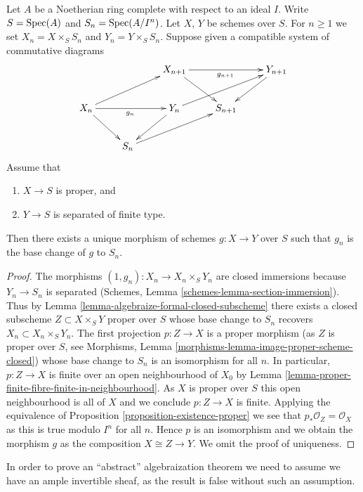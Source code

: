 \begin{lemma}
\label{lemma-algebraize-morphism}
Let $A$ be a Noetherian ring complete with respect to an ideal $I$.
Write $S = \mathop{\mathrm{Spec}}(A)$ and $S_n = \mathop{\mathrm{Spec}}(A/I^n)$. Let $X$, $Y$ be schemes
over $S$. For $n \geq 1$ we set $X_n = X \times_S S_n$ and
$Y_n = Y \times_S S_n$. Suppose given a compatible system of
commutative diagrams
$$
\xymatrix{
& & X_{n + 1} \ar[rd] \ar[rr]_{g_{n + 1}} & & Y_{n + 1} \ar[ld] \\
X_n \ar[rru] \ar[rd] \ar[rr]_{g_n} & & Y_n \ar[rru] \ar[ld] & S_{n + 1} \\
& S_n \ar[rru]
}
$$
Assume that
\begin{enumerate}
\item $X \to S$ is proper, and
\item $Y \to S$ is separated of finite type.
\end{enumerate}
Then there exists a unique morphism of schemes $g : X \to Y$
over $S$ such that $g_n$ is the base change of $g$ to $S_n$.
\end{lemma}

\begin{proof}
The morphisms $(1, g_n) : X_n \to X_n \times_S Y_n$ are closed immersions
because $Y_n \to S_n$ is separated
(Schemes, Lemma \ref{schemes-lemma-section-immersion}). Thus by
Lemma \ref{lemma-algebraize-formal-closed-subscheme}
there exists a closed subscheme $Z \subset X \times_S Y$
proper over $S$ whose base change to $S_n$ recovers
$X_n \subset X_n \times_S Y_n$. The first projection $p : Z \to X$
is a proper morphism (as $Z$ is proper over $S$, see
Morphisms, Lemma \ref{morphisms-lemma-image-proper-scheme-closed})
whose base change to $S_n$ is an isomorphism
for all $n$. In particular, $p : Z \to X$ is finite over an open
neighbourhood of $X_0$ by
Lemma \ref{lemma-proper-finite-fibre-finite-in-neighbourhood}.
As $X$ is proper over $S$ this open neighbourhood is all of $X$
and we conclude $p : Z \to X$ is finite.
Applying the equivalence of Proposition \ref{proposition-existence-proper}
we see that $p_*\mathcal{O}_Z = \mathcal{O}_X$ as this is true
modulo $I^n$ for all $n$. Hence $p$ is an isomorphism and we obtain
the morphism $g$ as the composition $X \cong Z \to Y$.
We omit the proof of uniqueness.
\end{proof}

\noindent
In order to prove an ``abstract'' algebraization theorem we need
to assume we have an ample invertible sheaf, as the result is false
without such an assumption.

